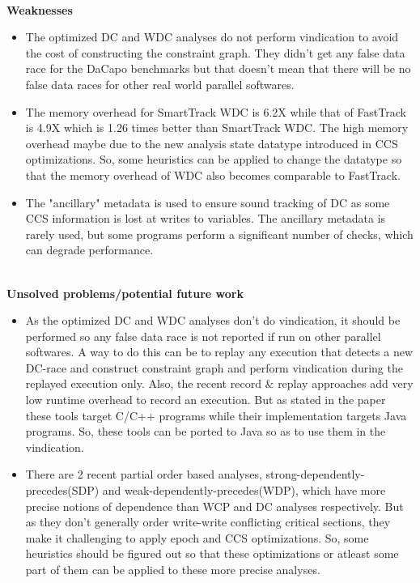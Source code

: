 \documentclass[20pt]{letter}
\begin{document}
\begin{enumerate}
{\textbf{\\Weaknesses}\\
\begin{itemize}
    \item The optimized DC and WDC analyses do not perform vindication to avoid the cost of constructing the constraint graph. They didn't get any false data race for the DaCapo benchmarks but that doesn't mean that there will be no false data races for other real world parallel softwares.
    \item The memory overhead for SmartTrack WDC is 6.2X while that of FastTrack is 4.9X which is 1.26 times better than SmartTrack WDC. The high memory overhead maybe due to the new analysis state datatype introduced in CCS optimizations. So, some heuristics can be applied to change the datatype so that the memory overhead of WDC also becomes comparable to FastTrack.
    \item The "ancillary" metadata is used to ensure sound tracking of DC as some CCS information is lost at writes to variables. The ancillary metadata is rarely used, but some programs perform a significant number of checks, which can degrade performance. 
\end{itemize}

\textbf{\\Unsolved problems/potential future work}\\
\begin{itemize}
    \item As the optimized DC and WDC analyses don't do vindication, it should be performed so any false data race is not reported if run on other parallel softwares. A way to do this can be to replay any execution that detects a new DC-race and construct constraint graph and perform vindication during the replayed execution only. Also, the recent record \& replay approaches add very low runtime overhead to record an execution. But as stated in the paper these tools target C/C++ programs while their implementation targets Java programs. So, these tools can be ported to Java so as to use them in the vindication.
    \item There are 2 recent partial order based analyses, strong-dependently-precedes(SDP) and weak-dependently-precedes(WDP), which have more precise notions of dependence than WCP and DC analyses respectively. But as they don't generally order write-write conflicting critical sections, they make it challenging to apply epoch and CCS optimizations. So, some heuristics should be figured out so that these optimizations or atleast some part of them can be applied to these more precise analyses.     
\end{itemize}
}
\end{enumerate}
\end{document}
